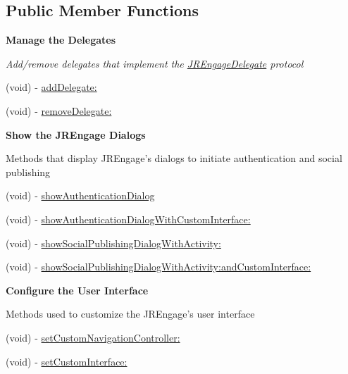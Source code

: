 \subsection*{Public Member Functions}
\begin{Indent}{\bf Manage the Delegates}\par
{\em \label{_amgrpf6bb425cb9b7388d33e37d551db6b02e}
 Add/remove delegates that implement the \hyperlink{protocol_j_r_engage_delegate-p}{JREngageDelegate} protocol }\begin{DoxyCompactItemize}
\item 
(void) -\/ \hyperlink{interface_j_r_engage_a18377ffb55f821587e6d38b3489692e8}{addDelegate:}
\item 
(void) -\/ \hyperlink{interface_j_r_engage_ab3f12ac148ea0f6df4d7ff7789cc7c94}{removeDelegate:}
\end{DoxyCompactItemize}
\end{Indent}
\begin{Indent}{\bf Show the JREngage Dialogs}\par
{\em \label{_amgrp345603279e1df04f4a3678e78089b7be}
 \label{interface_j_r_engage_showMethods}
\hypertarget{interface_j_r_engage_showMethods}{}


Methods that display JREngage's dialogs to initiate authentication and social publishing }\begin{DoxyCompactItemize}
\item 
(void) -\/ \hyperlink{interface_j_r_engage_a01ecdff491f91543e18f33d0e565b046}{showAuthenticationDialog}
\item 
(void) -\/ \hyperlink{interface_j_r_engage_ac8e1206be8608fbed548b7ec5f85e6e6}{showAuthenticationDialogWithCustomInterface:}
\item 
(void) -\/ \hyperlink{interface_j_r_engage_afca7b5ab9a57edc1a460aaec882207c4}{showSocialPublishingDialogWithActivity:}
\item 
(void) -\/ \hyperlink{interface_j_r_engage_af5c2aa40f5c45a22f369900d1bd81953}{showSocialPublishingDialogWithActivity:andCustomInterface:}
\end{DoxyCompactItemize}
\end{Indent}
\begin{Indent}{\bf Configure the User Interface}\par
{\em \label{_amgrp94e7ef441fcaa606cadd8cfd8b428e50}
 \label{interface_j_r_engage_customInterface}
\hypertarget{interface_j_r_engage_customInterface}{}


Methods used to customize the JREngage's user interface }\begin{DoxyCompactItemize}
\item 
(void) -\/ \hyperlink{interface_j_r_engage_a6c704bbff377d20603e6b52bd0ae17f1}{setCustomNavigationController:}
\item 
(void) -\/ \hyperlink{interface_j_r_engage_ab1757bbe9e83255b1b9128c630267fdf}{setCustomInterface:}
\end{DoxyCompactItemize}
\end{Indent}

